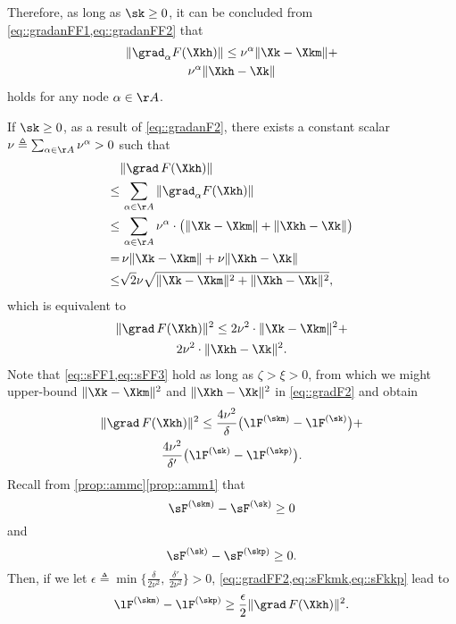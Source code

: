 Therefore, as long as $\sk\geq 0$, it can be concluded from \cref{eq::gradanFF1,eq::gradanFF2} that
\begin{multline}\label{eq::gradanF2}
\|\grad_{\alpha} F(\Xkh)\|\leq \nu^\alpha\|\Xk-\Xkm\|+\\ \nu^\alpha\|\Xkh-\Xk\|
\end{multline}
holds for any node $\alpha\in\AA$. 

If $\sk\geq 0$, as a result of \cref{eq::gradanF2}, there exists a constant scalar $\nu\triangleq\sum_{\alpha\in\AA}\nu^\alpha>0$ such that
\begin{equation}
\nonumber
\begin{aligned}
	&\|\grad\, F(\Xkh)\|\\
\leq&\,\sum_{\alpha\in\AA}\|\grad_\alpha F(\Xkh)\|\\
\leq&\,\sum_{\alpha\in\AA}\nu^\alpha\cdot\big(\|\Xk-\Xkm\| + \|\Xkh-\Xk\|\big)\\
=&\, \nu\|\Xk-\Xkm\| + \nu\|\Xkh-\Xk\|\\
\leq&\sqrt{2}\nu\sqrt{ \|\Xk-\Xkm\|^2 + \|\Xkh-\Xk\|^2},
\end{aligned}
\end{equation}
which is equivalent to
\begin{multline}\label{eq::gradF2}
\|\grad\,F(\Xkh)\|^2\leq 2\nu^2\cdot\|\Xk-\Xkm\|^2 + \\
2\nu^2\cdot\|\Xkh-\Xk\|^2.
\end{multline}
Note that \cref{eq::sFF1,eq::sFF3} hold as long as $\zeta>\xi>0$, from which we might upper-bound $\|\Xk-\Xkm\|^2$ and $\|\Xkh-\Xk\|^2$ in \cref{eq::gradF2} and obtain
\begin{multline}\label{eq::gradFF2}
	\|\grad\,F(\Xkh)\|^2\leq\frac{4\nu^2}{\delta}\big(\lF^{(\skm)}-\lF^{(\sk)}\big) +\\
	 \frac{4\nu^2}{\delta'}\big(\lF^{(\sk)}-\lF^{(\skp)}\big).
\end{multline}
Recall from \cref{prop::ammc}\ref{prop::amm1} that 
\begin{equation}\label{eq::sFkmk}
\sF^{(\skm)}-\sF^{(\sk)}\geq 0
\end{equation}
and 
\begin{equation}\label{eq::sFkkp}
\sF^{(\sk)}-\sF^{(\skp)}\geq 0.
\end{equation}
Then, if we let $\epsilon \triangleq \min\{\frac{\delta}{2\nu^2},\,\frac{\delta'}{2\nu^2}\}>0$, \cref{eq::gradFF2,eq::sFkmk,eq::sFkkp} lead to
\begin{equation}\label{eq::gradF3}
	\lF^{(\skm)}-\lF^{(\skp)} \geq \frac{\epsilon}{2}\|\grad\,F(\Xkh)\|^2.
\end{equation}
